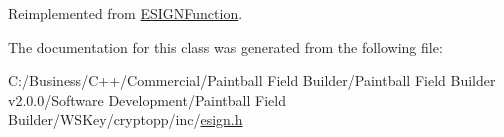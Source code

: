 Reimplemented from \hyperlink{class_e_s_i_g_n_function_ad9696d3e060bd7acb702b5bfa650eeb7}{ESIGNFunction}.

The documentation for this class was generated from the following file:\begin{DoxyCompactItemize}
\item 
C:/Business/C++/Commercial/Paintball Field Builder/Paintball Field Builder v2.0.0/Software Development/Paintball Field Builder/WSKey/cryptopp/inc/\hyperlink{esign_8h}{esign.h}\end{DoxyCompactItemize}
